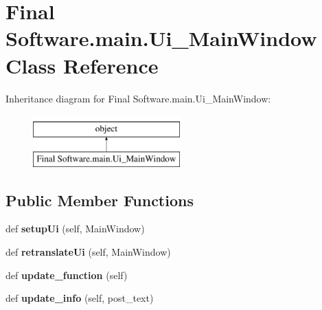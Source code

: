 \section{Final Software.\+main.\+Ui\+\_\+\+Main\+Window Class Reference}
\label{class_final_01_software_1_1main_1_1_ui___main_window}
Inheritance diagram for Final Software.\+main.\+Ui\+\_\+\+Main\+Window\+:\begin{figure}[H]
\begin{center}
\leavevmode
\includegraphics[height=2.000000cm]{class_final_01_software_1_1main_1_1_ui___main_window}
\end{center}
\end{figure}
\subsection*{Public Member Functions}
\begin{DoxyCompactItemize}
\item 
def \textbf{ setup\+Ui} (self, Main\+Window)
\item 
def \textbf{ retranslate\+Ui} (self, Main\+Window)
\item 
def \textbf{ update\+\_\+function} (self)
\item 
def \textbf{ update\+\_\+info} (self, post\+\_\+text)
\end{DoxyCompactItemize}
